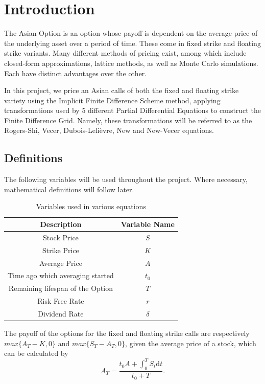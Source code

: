 \documentclass[12pt]{report}
\begin{document}
\newpage

\chapter{Introduction}

The Asian Option is an option whose payoff is dependent on the average price of the underlying asset over a period of time. These come in fixed strike and floating strike variants. Many different methods of pricing exist, among which include closed-form approximations, lattice methods, as well as Monte Carlo simulations. Each have distinct advantages over the other.

In this project, we price an Asian calls of both the fixed and floating strike variety using the Implicit Finite Difference Scheme method, applying transformations used by 5 different Partial Differential Equations to construct the Finite Difference Grid. Namely, these transformations will be referred to as the Rogers-Shi, Vecer, Dubois-Leli\`evre, New and New-Vecer equations.

\section{Definitions}
The following variables will be used throughout the project. Where necessary, mathematical definitions will follow later.
\begin{table}[H]
  \begin{tabular}{|c|c|}
    \hline
    \textbf{Description} & \textbf{Variable Name} \\ \hline
    Stock Price & \(S\) \\
    Strike Price & \(K\)\\
    Average Price & \(A\) \\
    Time ago which averaging started & \(t_0\) \\
    Remaining lifespan of the Option & \(T\) \\
    Risk Free Rate & \(r\) \\
    Dividend Rate & \(\delta\) \\
    \hline
  \end{tabular}
  \caption{Variables used in various equations}
  \label{table:name}
\end{table}

The payoff of the options for the fixed and floating strike calls are respectively \(max\{A_T - K, 0\}\) and \(max\{S_T - A_T, 0\}\), given the average price of a stock, which can be calculated by
\begin{equation}
  A_T = \frac{t_0A + \int_0^T S_t \mathrm{d}t}{t_0 + T}.
\end{equation}
\end{document}
